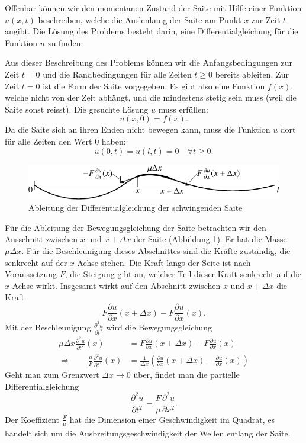 Offenbar können wir den momentanen Zustand der Saite mit Hilfe einer
Funktion $u(x,t)$ beschreiben, welche die Auslenkung der Saite
am Punkt $x$ zur Zeit $t$ angibt. Die Lösung des Problems besteht darin,
eine Differentialgleichung für die Funktion $u$ zu finden.

Aus dieser Beschreibung des Problems können wir die Anfangsbedingungen zur
Zeit $t=0$ und die Randbedingungen für alle Zeiten $t\ge 0$ bereits ableiten.
Zur Zeit $t=0$ ist die Form der Saite vorgegeben. Es gibt also eine Funktion
$f(x)$, welche nicht von der Zeit abhängt, und die mindestens stetig
sein muss (weil die Saite sonst reisst). Die gesuchte Lösung $u$
muss erfüllen:
\[
u(x,0)=f(x).
\]
Da die Saite sich an ihren Enden nicht bewegen kann, muss die Funktion
$u$ dort für alle Zeiten den Wert $0$ haben:
\[
u(0,t)=u(l,t)=0\quad\forall t\ge 0.
\]

\begin{figure}
\begin{center}
\includegraphics[width=\hsize]{../common/images/saite-1}
\end{center}
\caption{Ableitung der Differentialgleichung der schwingenden Saite\label{saite}}
\end{figure}
Für die Ableitung der Bewegungsgleichung der Saite betrachten wir den
Ausschnitt zwischen $x$ und $x+\Delta x$ der Saite (Abbildung \ref{saite}).
Er hat die Masse
$\mu \Delta x$. Für die Beschleunigung dieses Abschnittes sind die
Kräfte zuständig, die senkrecht auf der $x$-Achse stehen. Die Kraft längs
der Seite ist nach Voraussetzung $F$, die Steigung gibt an, welcher Teil
dieser Kraft senkrecht auf die $x$-Achse wirkt. Insgesamt wirkt auf den
Abschnitt zwischen $x$ und $x+\Delta x$ die Kraft
\[
F\frac{\partial u}{\partial x}(x+\Delta x)-F\frac{\partial u}{\partial x}(x).
\]
Mit der Beschleunigung $\frac{\partial^2u}{\partial t^2}$ wird die
Bewegungsgleichung
\begin{align*}
\mu\Delta x\frac{\partial^2u}{\partial t^2}(x)&=
F\frac{\partial u}{\partial x}(x+\Delta x)-F\frac{\partial u}{\partial x}(x)\\
\Rightarrow\qquad
\frac{\mu}{F}\frac{\partial^2u}{\partial t^2}(x)&=
\frac1{\Delta x}\left(\frac{\partial u}{\partial x}(x+\Delta x)-\frac{\partial u}{\partial x}(x)\right)
\end{align*}
Geht man zum Grenzwert $\Delta x\to 0$ über, findet man die
partielle Differentialgleichung
\[
\frac{\partial^2u}{\partial t^2}=\frac{F}{\mu}\frac{\partial^2u}{\partial x^2}.
\]
Der Koeffizient $\frac{F}{\mu}$ hat die Dimension einer Geschwindigkeit im
Quadrat, es handelt sich um die Ausbreitungsgeschwindigkeit der Wellen entlang
der Saite.

